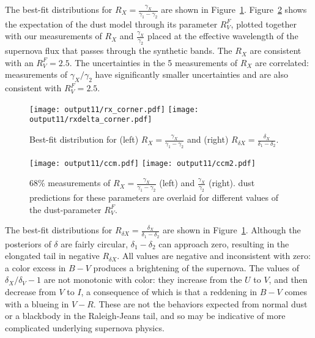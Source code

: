 \documentclass{aastex}   	%
\begin{document}
The best-fit distributions for $R_X=\frac{\gamma_X}{\gamma_1-\gamma_2}$ are shown in Figure~\ref{rx:fig}.  Figure~\ref{ccm:fig}
shows the expectation of the \citet{1999PASP..111...63F} dust model through its parameter $R^F_V$, plotted together with our measurements of
$R_X$ and $\frac{\gamma_X}{\gamma_2}$ placed at the effective wavelength of the supernova flux that passes
through the synthetic bands.
The $R_X$ are consistent with an  $R^F_V=2.5$.  The uncertainties in the 5 measurements
of $R_X$ are correlated: measurements of $\gamma_X/\gamma_2$ have significantly smaller
uncertainties and are also consistent with $R^F_V=2.5$. 

\begin{figure}[htbp] %
   \centering
   \texttt{[image: output11/rx\_corner.pdf]}
      \texttt{[image: output11/rxdelta\_corner.pdf]} 
   \caption{Best-fit distribution for (left)  $R_X=\frac{\gamma_X}{\gamma_1-\gamma_2}$ and (right)  $R_{\delta X}=\frac{\delta_X}{\delta_1-\delta_2}$.
   \label{rx:fig}}
\end{figure}

\begin{figure}[htbp] %
   \centering
   \texttt{[image: output11/ccm.pdf]}
      \texttt{[image: output11/ccm2.pdf]} 
   \caption{68\% measurements of $R_X=\frac{\gamma_X}{\gamma_1-\gamma_2}$ (left) and $\frac{\gamma_X}{\gamma_2}$ (right). \citet{1999PASP..111...63F} dust
   predictions for these parameters are overlaid for different values of the dust-parameter $R^F_V$.
   \label{ccm:fig}}
\end{figure}

The best-fit distributions for $R_{\delta X}=\frac{\delta_X}{\delta_1-\delta_2}$ are shown in Figure~\ref{rx:fig}.
Although the posteriors of $\delta$ are fairly circular, $\delta_1-\delta_2$ can approach zero, resulting in the
elongated tail in negative  $R_{\delta X}$.
All values are negative and inconsistent with zero: a color excess in $B-V$ produces a brightening of the supernova.
The values of $\delta_X/\delta_V-1$ are not monotonic with color: they increase from the $U$ to $V$, and then decrease
from $V$ to $I$,
a consequence
of which is that
a reddening in $B-V$ comes with a blueing in $V-R$.
These are not the behaviors expected from normal dust or a blackbody in the Raleigh-Jeans tail, and so may be indicative of
more complicated underlying supernova physics.
\end{document}
